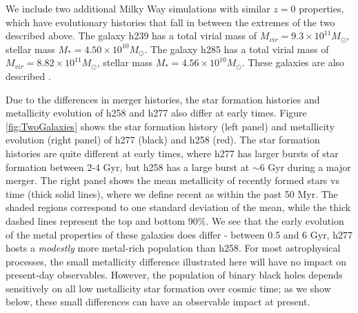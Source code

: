 \documentclass[nofootinbib,twocolumn,prd]{emulateapj}
\newcommand\jillianremark[1]{{\color{blue}#1}}
\newcommand\msun{M_\odot}
\begin{document}
We include two additional Milky Way simulations with similar $z = 0$ properties, which have evolutionary histories that fall in between the extremes of the two described above.  The galaxy h239 has a total virial mass of $M_{vir} = 9.3 \times 10^{11}\msun$, stellar mass $M_* = 4.50 \times 10^{10}
\msun$.%
The galaxy h285 has a total virial mass of $M_{vir} = 8.82 \times 10^{11}\msun$, stellar mass $M_* = 4.56 \times 10^{10}
\msun$.%
These galaxies are also described \citet{Munshi13,Bellovary14}.

  Due to the differences in merger histories, the star formation histories and metallicity
  evolution of h258 and h277 also differ at early times.  Figure
  \ref{fig:TwoGalaxies} shows the star formation history (left panel) and metallicity evolution (right panel) of h277 (black) and h258 (red).  The star formation histories are quite different at early times, where h277 has larger bursts of star formation between 2-4 Gyr, but h258 has a large burst at $\sim 6$ Gyr during a major merger.   The right panel shows the mean metallicity of
  recently formed stars vs time (thick solid lines), where we define
  recent as within the past 50 Myr.  The shaded regions correspond to
  one standard deviation of the mean, while the thick dashed lines
  represent the top and bottom 90\%.  We see that the early evolution
  of the metal properties of these galaxies does differ - between 0.5
  and 6 Gyr, h277 hosts a \emph{modestly}  more metal-rich population than
  h258.   For most astrophysical processes, the small metallicity difference illustrated here will have no impact on
  present-day observables.  However,  the population of binary black holes  depends sensitively on all low metallicity star formation
  over cosmic time; as we show below, these small differences can have an observable impact at present.   
\end{document}
